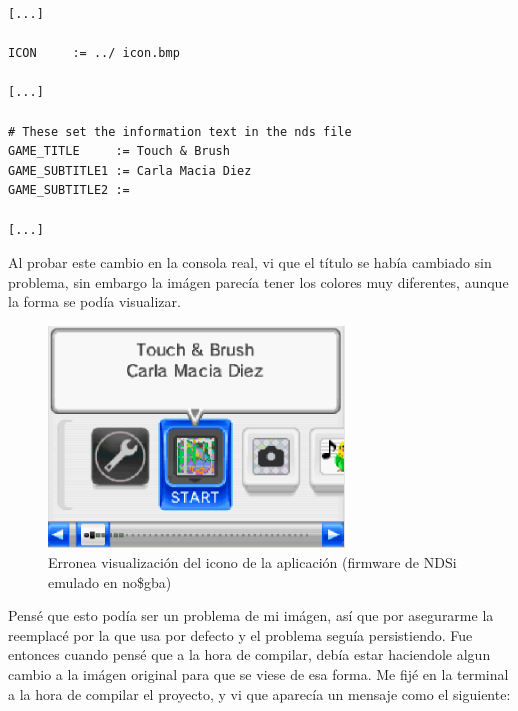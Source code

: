  \vspace{0.5cm}

   \begin{lstlisting}[caption={Cambios en el Makefile para establecer el título y el icono}, label={code:gamenamemakefile}]
[...]

ICON     := ../ icon.bmp

[...]

# These set the information text in the nds file
GAME_TITLE     := Touch & Brush
GAME_SUBTITLE1 := Carla Macia Diez
GAME_SUBTITLE2 := 

[...]

\end{lstlisting}

 \vspace{0.5cm}

Al probar este cambio en la consola real, vi que el título se había cambiado sin problema, sin embargo la imágen parecía tener los colores muy diferentes, aunque la forma se podía visualizar.

 \vspace{0.5cm}

\begin{figure}[htbp]
\centering
  \includegraphics[width=0.7\textwidth]{archivos/icon_corrupted.png}
  \caption{Erronea visualización del icono de la aplicación (firmware de NDSi emulado en no\$gba)}
  \label{fig:icon_corrupted}
\end{figure}

 \vspace{0.5cm}

Pensé que esto podía ser un problema de mi imágen, así que por asegurarme la reemplacé por la que usa por defecto y el problema seguía persistiendo. Fue entonces cuando pensé que a la hora de compilar, debía estar haciendole algun cambio a la imágen original para que se viese de esa forma. Me fijé en la terminal a la hora de compilar el proyecto, y vi que aparecía un mensaje como el siguiente:


